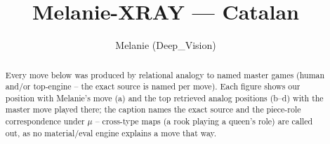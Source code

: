 \documentclass[11pt]{article}
\title{Melanie-XRAY — Catalan}
\author{Melanie (Deep\_Vision)}
\date{}
\begin{document}
\maketitle

\begin{abstract}Every move below was produced by relational analogy to named master games (human and/or top-engine -- the exact source is named per move). Each figure shows our position with Melanie's move (a) and the top retrieved analog positions (b--d) with the master move played there; the caption names the exact source and the piece-role correspondence under $\mu$ -- cross-type maps (a rook playing a queen's role) are called out, as no material/eval engine explains a move that way.\end{abstract}

\begin{figure}[p]\centering
\begin{subfigure}{0.46\textwidth}\centering
\resizebox{\linewidth}{!}{%
\newchessgame
\chessboard[
  setfen={rnbq1rk1/ppp1bppp/4pn2/8/2pP4/5NP1/PP2PPBP/RNBQ1RK1 w - - 0 7},
  showmover=false,
  pgfstyle=straightmove, color=movearrow, markmove={f3-e5}
]}
\caption{}
\end{subfigure}\hfill
\begin{subfigure}{0.46\textwidth}\centering
\resizebox{\linewidth}{!}{%
\newchessgame
\chessboard[
  setfen={rnbq1rk1/ppp1bppp/4pn2/8/2pP4/5NP1/PP2PPBP/RNBQ1RK1 w - - 0 7},
  showmover=false,
  pgfstyle=straightmove, color=movearrow, markmove={f3-e5}
]}
\caption{}
\end{subfigure}
\\[4pt]
\begin{subfigure}{0.46\textwidth}\centering
\resizebox{\linewidth}{!}{%
\newchessgame
\chessboard[
  setfen={rnbq1rk1/ppp1bppp/4pn2/8/2pP4/5NP1/PP2PPBP/RNBQ1RK1 w - - 0 7},
  showmover=false,
  pgfstyle=straightmove, color=movearrow, markmove={f3-e5}
]}
\caption{}
\end{subfigure}\hfill
\begin{subfigure}{0.46\textwidth}\centering
\resizebox{\linewidth}{!}{%
\newchessgame
\chessboard[
  setfen={rnbq1rk1/ppp1bppp/4pn2/8/2pP4/5NP1/PP2PPBP/RNBQ1RK1 w - - 0 7},
  showmover=false,
  pgfstyle=straightmove, color=movearrow, markmove={f3-e5}
]}
\caption{}
\end{subfigure}

\end{figure}
\end{document}
